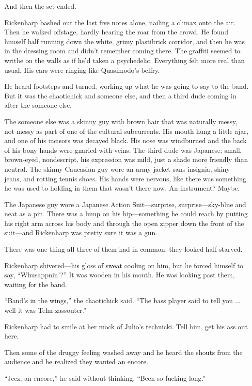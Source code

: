 And then the set ended.

Rickenharp bashed out the last five notes alone, nailing a climax onto the air. Then he walked offstage, hardly hearing the roar from the crowd. He found himself half running down the white, grimy plastibrick corridor, and then he was in the dressing room and didn't remember coming there. The graffiti seemed to writhe on the walls as if he'd taken a psychedelic. Everything felt more real than usual. His ears were ringing like Quasimodo's belfry.

He heard footsteps and turned, working up what he was going to say to the band. But it was the chaotichick and someone else, and then a third dude coming in after the someone else.

The someone else was a skinny guy with brown hair that was naturally messy, not messy as part of one of the cultural subcurrents. His mouth hung a little ajar, and one of his incisors was decayed black. His nose was windburned and the back of his bony hands were gnarled with veins. The third dude was Japanese; small, brown-eyed, nondescript, his expression was mild, just a shade more friendly than neutral. The skinny Caucasian guy wore an army jacket sans insignia, shiny jeans, and rotting tennis shoes. His hands were nervous, like there was something he was used to holding in them that wasn't there now. An instrument? Maybe.

The Japanese guy wore a Japanese Action Suit—surprise, surprise—sky-blue and neat as a pin. There was a lump on his hip—something he could reach by putting his right arm across his body and through the open zipper down the front of the suit—and Rickenharp was pretty sure it was a gun.

There was one thing all three of them had in common: they looked half-starved.

Rickenharp shivered—his gloss of sweat cooling on him, but he forced himself to say, ``Whusappnin'?'' It was wooden in his mouth. He was looking past them, waiting for the band.

``Band's in the wings,'' the chaotichick said. ``The bass player said to tell you ... well it was Telm zassouter.''

Rickenharp had to smile at her mock of Julio's technicki. Tell him, get his ass out here.

Then some of the druggy feeling washed away and he heard the shouts from the audience and he realized they wanted an encore.

``Jeez, an encore,'' he said without thinking. ``Been so fucking long.''

